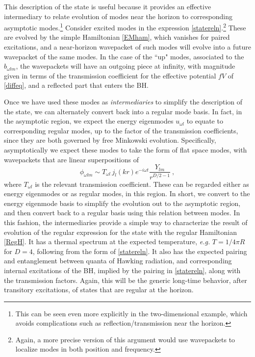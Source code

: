 \documentclass[12pt]{article}
\numberwithin{equation}{section}
\newcommand{\beq}{\begin{equation}}
\newcommand{\eeq}{\end{equation}}
\begin{document}
This description of the state is useful because it provides an effective intermediary to relate evolution of modes near the horizon to corresponding asymptotic modes.\footnote{This can be seen even more explicitly in the two-dimensional example\cite{SE2d}, which avoids complications such as reflection/transmission near the horizon.}  Consider  excited modes in the expression \eqref{statereln}.\footnote{Again, a more precise version of this argument would use wavepackets to localize modes in both position and frequency.}  These are evolved by the simple Hamiltonian \eqref{EMham}, which vanishes for paired excitations, and a near-horizon wavepacket of such modes will evolve into a future wavepacket of the same modes.  In the case of the ``up" modes, associated to the $b_{\omega l m}$, the wavepackets will have an outgoing piece at infinity, with magnitude given in terms of the transmission coefficient for the effective potential $fV$ of \eqref{diffeq}, and a reflected part that enters the BH.

Once we have used these modes as {\it intermediaries} to simplify the description of the state, we can alternately convert back into a regular mode basis.  In fact, in the asymptotic region, we expect the energy eigenmodes $u_{\omega l}$ to equate to corresponding regular modes, up to the factor of the transmission coefficients, since they are both governed by free Minkowski evolution.   Specifically, asymptotically we expect these modes to take the form of flat space modes, with wavepackets that are linear superpositions of
\beq
\phi_{\omega l m} \sim T_{\omega l}\, j_l(kr) e^{-i\omega t}\frac{Y_{lm}}{r^{D/2-1}}\ ,
\eeq
where $T_{\omega l}$ is the relevant transmission coefficient.  These can be regarded either as energy eigenmodes or as regular modes, in this region.
 In short, we convert to the energy eigenmode basis to simplify the evolution out to the asymptotic region, and then convert back to a regular basis using this relation between modes.
In this fashion, the intermediaries provide a simple way to characterize the result of evolution of the regular expression for the state with the regular Hamiltonian \eqref{RegH}.   It has a thermal spectrum at the expected temperature, {\it e.g.}  $T=1/4\pi R$ for $D=4$, following from the form of \eqref{statereln}.  It also has the expected pairing and entanglement between  quanta of Hawking radiation, and corresponding internal excitations of the BH, implied by the pairing in  \eqref{statereln}, along with the transmission factors.  Again, this will be the generic long-time behavior, after transitory excitations, of states that are regular at the horizon.
\end{document}
